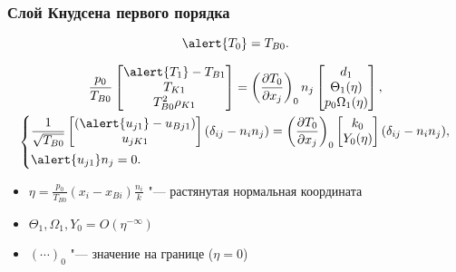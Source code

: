 \documentclass[mathserif]{beamer} %
\newcommand{\pder}[2][]{\frac{\partial#1}{\partial#2}}
\newcommand{\OO}[1]{O(#1)}
\newcommand{\onwall}[1]{\left(#1\right)_0}
\newcommand{\deltann}[2]{(\delta_{#1#2}-n_#1 n_#2)}
\begin{document}
\begin{frame}
    \frametitle{Слой Кнудсена первого порядка}
    \begin{equation}
        \alert{T_0} = T_{B0}. \label{eq:bc_T0}
    \end{equation}

    \begin{gather}
        \frac{p_0}{T_{B0}}
            \begin{bmatrix} \alert{T_1} - T_{B1} \\ T_{K1} \\ T_{B0}^2\rho_{K1} \end{bmatrix} =
            \onwall{\pder[T_0]{x_j}} n_j \begin{bmatrix} d_1 \\ \Theta_1(\eta) \\ p_0\Omega_1(\eta) \end{bmatrix}, \\
        \left\{
        \begin{aligned}
            & \frac1{\sqrt{T_{B0}}}\begin{bmatrix} (\alert{u_{j1}} - u_{Bj1}) \\ u_{jK1} \end{bmatrix} \deltann{i}{j} =
                \onwall{\pder[T_0]{x_j}}\begin{bmatrix} k_0 \\ Y_0(\eta) \end{bmatrix}\deltann{i}{j}, \\
            & \alert{u_{j1}} n_j = 0.
        \end{aligned}
        \right.
    \end{gather}
    \vspace{-20pt}
    \begin{itemize}
        \item \(\eta = \frac{p_0}{T_{B0}}(x_i-x_{Bi})\frac{n_i}k \) "--- растянутая нормальная координата
        \item \(\Theta_1, \Omega_1, Y_0 = \OO{\eta^{-\infty}}\)
        \item \(\onwall{\cdots}\) "--- значение на границе (\(\eta=0\))
    \end{itemize}
\end{frame}
\end{document}
